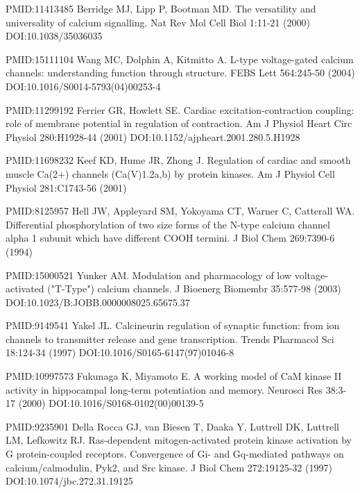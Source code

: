 \begin{thebibliography}{00}
PMID:11413485
 Berridge MJ, Lipp P, Bootman MD.
\newblock The versatility and universality of calcium signalling.
\newblock Nat Rev Mol Cell Biol 1:11-21 (2000) DOI:10.1038/35036035

PMID:15111104
 Wang MC, Dolphin A, Kitmitto A.
\newblock L-type voltage-gated calcium channels: understanding function through structure.
\newblock FEBS Lett 564:245-50 (2004) DOI:10.1016/S0014-5793(04)00253-4

PMID:11299192
 Ferrier GR, Howlett SE.
\newblock Cardiac excitation-contraction coupling: role of membrane potential in regulation of contraction.
\newblock Am J Physiol Heart Circ Physiol 280:H1928-44 (2001) DOI:10.1152/ajpheart.2001.280.5.H1928

PMID:11698232
 Keef KD, Hume JR, Zhong J.
\newblock Regulation of cardiac and smooth muscle Ca(2+) channels (Ca(V)1.2a,b) by protein kinases.
\newblock Am J Physiol Cell Physiol 281:C1743-56 (2001)

PMID:8125957
 Hell JW, Appleyard SM, Yokoyama CT, Warner C, Catterall WA.
\newblock Differential phosphorylation of two size forms of the N-type calcium channel alpha 1 subunit which have different COOH termini.
\newblock J Biol Chem 269:7390-6 (1994)

PMID:15000521
 Yunker AM.
\newblock Modulation and pharmacology of low voltage-activated ("T-Type") calcium channels.
\newblock J Bioenerg Biomembr 35:577-98 (2003) DOI:10.1023/B:JOBB.0000008025.65675.37

PMID:9149541
 Yakel JL.
\newblock Calcineurin regulation of synaptic function: from ion channels to transmitter release and gene transcription.
\newblock Trends Pharmacol Sci 18:124-34 (1997) DOI:10.1016/S0165-6147(97)01046-8

PMID:10997573
 Fukunaga K, Miyamoto E.
\newblock A working model of CaM kinase II activity in hippocampal long-term potentiation and memory.
\newblock Neurosci Res 38:3-17 (2000) DOI:10.1016/S0168-0102(00)00139-5

PMID:9235901
 Della Rocca GJ, van Biesen T, Daaka Y, Luttrell DK, Luttrell LM, Lefkowitz RJ.
\newblock Ras-dependent mitogen-activated protein kinase activation by G protein-coupled receptors. Convergence of Gi- and Gq-mediated pathways on calcium/calmodulin, Pyk2, and Src kinase.
\newblock J Biol Chem 272:19125-32 (1997) DOI:10.1074/jbc.272.31.19125


\end{thebibliography}
